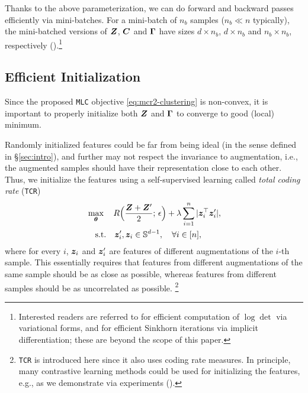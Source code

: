 \documentclass[10pt,twocolumn,letterpaper]{article}
\newcommand{\ours}{MLC}
\newcommand{\mours}{\texttt{\ours}}
\begin{document}
    Thanks to the above parameterization, we can do forward and backward passes efficiently via mini-batches. For a mini-batch of $n_b$ samples ($n_b \ll n$ typically), the mini-batched versions of ${\bm{Z}}$, ${\bm{C}}$ and $\boldsymbol{\Gamma}$ have sizes $d\times n_b$, $d\times n_b$ and $n_b\times n_b$, respectively ().\footnote{Interested readers are referred to \cite{Baek2022-bj} for efficient computation of $\log\det$ via variational forms, and \cite{Eisenberger2022-oo} for efficient Sinkhorn iterations via implicit differentiation; these are beyond the scope of this paper.}
   
   
   \subsection{Efficient Initialization} \label{sec:algo-init}
   Since the proposed \mours{} objective \eqref{eq:mcr2-clustering} is non-convex, it is important to properly initialize both ${\bm{Z}}$ and $\boldsymbol{\Gamma}$ to converge to good (local) minimum. 

    Randomly initialized features could be far from being ideal (in the sense defined in \S \ref{sec:intro}), and further may not respect the invariance to augmentation, i.e., the augmented samples should have their representation close to each other. Thus, we initialize the features using a self-supervised learning called \textit{total coding rate} (\texttt{TCR}) \cite{Li2022-vq}
   \def\txttcrobj{
     R\Big(\frac{\mZ+\mZ'}{2};\,\epsilon\Big) + \lambda \sum_{i=1}^{n} |\vz_i^\top \vz'_i|
   }
   \def\txttcrunitnorm{
   \vz_i',\vz_i\in \sS^{d-1}, \quad \forall i\in [n]
   }
   \begin{align}
       & \max_{\btheta} \quad  \txttcrobj, \nonumber\\
       & \quad \text{s.t.} \quad  \txttcrunitnorm \label{eq:opt-tcr-sup},
   \end{align}
   where for every $i$, ${\bm{z}}_i$ and ${\bm{z}}'_i$ are features of different augmentations of the $i$-th sample. 
   This essentially requires that features from different augmentations of the same sample should be as close as possible, whereas features from different samples should be as uncorrelated as possible. \footnote{\texttt{TCR} is introduced here since it also uses coding rate measures. In principle, many contrastive learning methods could be used for initializing the features, e.g., as we demonstrate via experiments ().}
   
\end{document}
